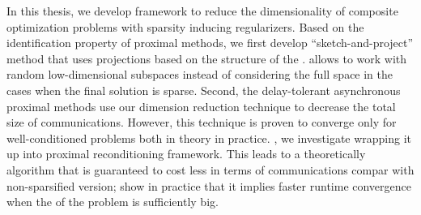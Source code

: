 % 
% 
%
In this thesis, we develop  framework to reduce the dimensionality of composite optimization problems with sparsity inducing regularizers.%
Based on the identification property of proximal methods, we first develop  ``sketch-and-project'' method that uses projections based on the structure of the .  allows to work with random low-dimensional subspaces instead of considering the full space in the cases when the final solution is sparse. Second,  the delay-tolerant asynchronous proximal methods  use our dimension reduction technique to decrease the total size of communications.
However, this technique is proven to converge only for well-conditioned problems both in theory in practice.
, we investigate wrapping it up into  proximal reconditioning framework. This leads to a theoretically  algorithm that is guaranteed to cost less in terms of communications compar with  non-sparsified version;  show in practice that it implies faster runtime convergence when the  of the problem is sufficiently big.